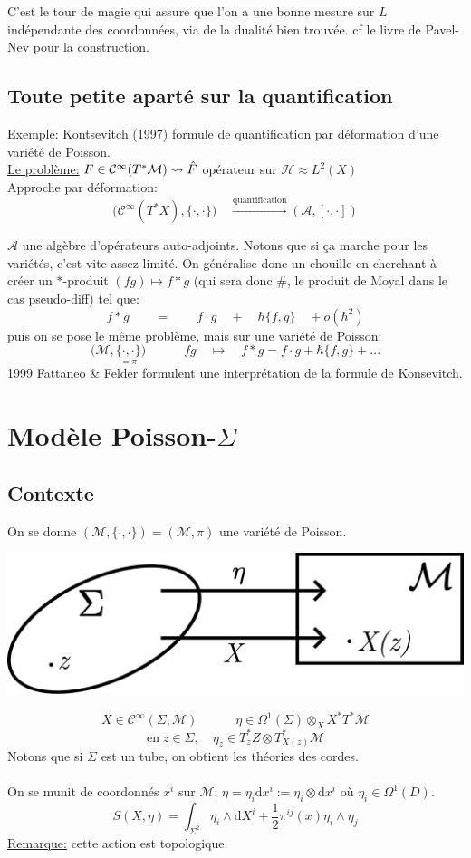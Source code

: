 \documentclass[a4paper,11pt]{article}
\renewcommand{\d}{{\mathrm{d}}}
\begin{document}
C'est le tour de magie qui assure que l'on a une bonne mesure sur $L$ indépendante des coordonnées, via de la dualité bien trouvée. cf le livre de Pavel-Nev pour la construction.

\subsection{Toute petite aparté sur la quantification}
\underline{Exemple:} Kontsevitch (1997) formule de quantification par déformation d'une variété de Poisson.\\

\noindent\underline{Le problème:}
$F \in \mathcal{C}^\infty(T^*\mathcal M) \rightsquigarrow \Hat F$ opérateur sur $\mathcal{H}\approx L^2(X)$\\
Approche par déformation: 
$$\Big( \mathcal{C}^\infty(T^*X), \{\cdot,\cdot\}\Big) \quad \overset{\mathrm{quantification}}\longrightarrow (\mathcal{A},[\cdot,\cdot])$$

$\mathcal{A}$ une algèbre d'opérateurs auto-adjoints. Notons que si ça marche pour les variétés, c'est vite assez limité. On généralise donc un chouille en cherchant à créer un $*$-produit $(fg)\mapsto f * g$ (qui sera donc \#, le produit de Moyal dans le cas pseudo-diff) tel que:
$$f*g \quad\quad = \quad\quad f \cdot g \quad+\quad \hbar \{f,g\} \quad+ o(\hbar^2)$$
puis on se pose le même problème, mais sur une variété de Poisson:
$$\Big(\mathcal M, \underset{=\pi}{\{\cdot,\cdot\}}\Big) \quad \quad \quad fg \quad \mapsto \quad f*g = f\cdot g + \hbar \{f,g\} + ...$$
1999 Fattaneo \& Felder formulent une interprétation de la formule de Konsevitch.

\section{Modèle Poisson-$\Sigma$}
\subsection{Contexte}
On se donne $(\mathcal{M},\{\cdot,\cdot\}) = (\mathcal{M},\pi)$ une variété de Poisson. 
\begin{center}
	\includegraphics[width=.5\textwidth]{Drawings/Draw_4.pdf}
\end{center}
$$X \in \mathcal{C}^\infty (\Sigma,\mathcal M)\quad\quad\quad \eta \in\Omega^1(\Sigma)\otimes_X X^*T^*\mathcal{M}$$
$$\mathrm{en}\; z \in \Sigma, \quad \eta_z \in T^*_z Z \otimes T^*_{X(z)}\mathcal{M}$$
Notons que si $\Sigma$ est un tube, on obtient les théories des cordes.\\ \\
On se munit de coordonnés $x^i$ sur $\mathcal{M}$; $\eta = \eta_i \d x^i:= \eta_i\otimes \d x^i$ où $\eta_i \in \Omega^1(D)$.
$$S(X,\eta) = \int_{\Sigma^2} \eta_i \wedge \d X^i + \frac12 \pi^{ij} (x) \eta_i\wedge \eta_j $$
\underline{Remarque:} cette action est topologique.
\end{document}
